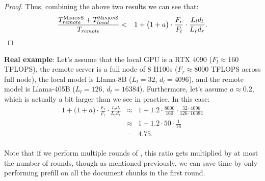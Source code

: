 \begin{proposition}
\begin{proof}
Thus, combining the above two results we can see that:
\begin{eqnarray*}
\frac{T_{remote}^{\textsc{MinionS}} + T_{local}^{\textsc{MinionS}}}{T_{remote}} &<& 1 + \big(1 + a \big) \cdot \frac{F_r}{F_l} \cdot \frac{L_l d_l}{L_r d_r}. \\
\end{eqnarray*}

\end{proof}

\end{proposition}

\textbf{Real example}: Let's assume that the local GPU is a RTX 4090 ($F_l \approx 160$ TFLOPS), the remote server is a full node of 8 H100s ($F_r \approx 8000$ TFLOPS across full node), the local model is Llama-8B ($L_l=32$, $d_l=4096$), and the remote model is Llama-405B ($L_l=126$, $d_l=16384$).
Furthermore, let's assume $a \approx 0.2$, which is actually a bit larger than we see in practice.
In this case:
\begin{eqnarray*}
1 + \big(1 + a \big) \cdot \frac{F_r}{F_l} \cdot \frac{L_l d_l}{L_r d_r} &\approx& 1 + 1.2 \cdot \frac{8000}{160} \cdot \frac{32 \cdot 4096}{126 \cdot 16384} \\
&\approx& 1 + 1.2 \cdot 50 \cdot \frac{1}{16} \\
&=& 4.75. \\
\end{eqnarray*}

Note that if we perform multiple rounds of \system, this ratio gets multiplied by at most the number of rounds, though as mentioned previously, we can save time by only performing prefill on all the document chunks in the first round.




